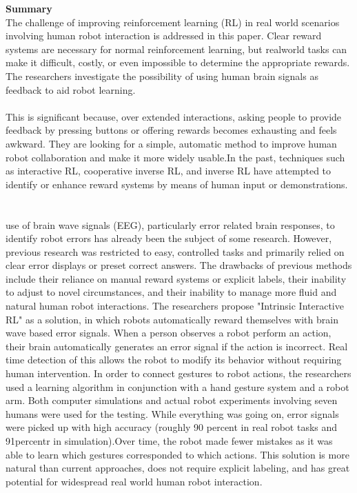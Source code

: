 \documentclass[report.tex]{subfiles}
\begin{document}
\noindent\textbf{Summary} \\
The challenge of improving reinforcement learning (RL) in real world scenarios involving human robot interaction is addressed in this paper.  Clear reward systems are necessary for normal reinforcement learning, but realworld tasks can make it difficult, costly, or even impossible to determine the appropriate rewards.  The researchers investigate the possibility of using human brain signals as feedback to aid robot learning.\\\\
 This is significant because, over extended interactions, asking people to provide feedback by pressing buttons or offering rewards becomes exhausting and feels awkward.  They are looking for a simple, automatic method to improve human robot collaboration and make it more widely usable.In the past, techniques such as interactive RL, cooperative inverse RL, and inverse RL have attempted to identify or enhance reward systems by means of human input or demonstrations.  \\\\\\\The use of brain wave signals (EEG), particularly error related brain responses, to identify robot errors has already been the subject of some research.  However, previous research was restricted to easy, controlled tasks and primarily relied on clear error displays or preset correct answers.
 The drawbacks of previous methods include their reliance on manual reward systems or explicit labels, their inability to adjust to novel circumstances, and their inability to manage more fluid and natural human robot interactions.
\noindent\textbf{}The researchers propose "Intrinsic Interactive RL" as a solution, in which robots automatically reward themselves with brain wave based error signals.  When a person observes a robot perform an action, their brain automatically generates an error signal if the action is incorrect.  Real time detection of this allows the robot to modify its behavior without requiring human intervention.  In order to connect gestures to robot actions, the researchers used a learning algorithm in conjunction with a hand gesture system and a robot arm.
 Both computer simulations and actual robot experiments involving seven humans were used for the testing.  While everything was going on, error signals were picked up with high accuracy (roughly 90 percent in real robot tasks and 91percentr  in simulation).Over time, the robot made fewer mistakes as it was able to learn which gestures corresponded to which actions. This solution is more natural than current approaches, does not require explicit labeling, and has great potential for widespread real world human robot interaction.\\\\
\end{document}
